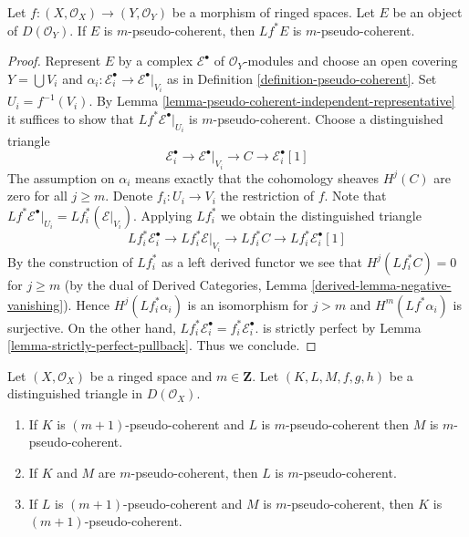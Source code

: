 \begin{lemma}
\label{lemma-pseudo-coherent-pullback}
Let $f : (X, \mathcal{O}_X) \to (Y, \mathcal{O}_Y)$
be a morphism of ringed spaces. Let $E$ be an object of
$D(\mathcal{O}_Y)$. If $E$ is $m$-pseudo-coherent,
then $Lf^*E$ is $m$-pseudo-coherent.
\end{lemma}

\begin{proof}
Represent $E$ by a complex $\mathcal{E}^\bullet$ of $\mathcal{O}_Y$-modules
and choose an open covering $Y = \bigcup V_i$ and
$\alpha_i : \mathcal{E}_i^\bullet \to \mathcal{E}^\bullet|_{V_i}$
as in Definition \ref{definition-pseudo-coherent}.
Set $U_i = f^{-1}(V_i)$.
By Lemma \ref{lemma-pseudo-coherent-independent-representative}
it suffices to show that $Lf^*\mathcal{E}^\bullet|_{U_i}$ is
$m$-pseudo-coherent.
Choose a distinguished triangle
$$
\mathcal{E}_i^\bullet \to
\mathcal{E}^\bullet|_{V_i} \to
C \to
\mathcal{E}_i^\bullet[1]
$$
The assumption on $\alpha_i$ means exactly that the cohomology sheaves
$H^j(C)$ are zero for all $j \geq m$. Denote $f_i : U_i \to V_i$
the restriction of $f$. Note that $Lf^*\mathcal{E}^\bullet|_{U_i} = 
Lf_i^*(\mathcal{E}|_{V_i})$. Applying $Lf_i^*$ we obtain
the distinguished triangle
$$
Lf_i^*\mathcal{E}_i^\bullet \to
Lf_i^*\mathcal{E}|_{V_i} \to
Lf_i^*C \to
Lf_i^*\mathcal{E}_i^\bullet[1]
$$
By the construction of $Lf_i^*$ as a left derived functor we see that
$H^j(Lf_i^*C) = 0$ for $j \geq m$ (by the dual of Derived Categories, Lemma
\ref{derived-lemma-negative-vanishing}). Hence $H^j(Lf_i^*\alpha_i)$ is an
isomorphism for $j > m$ and $H^m(Lf^*\alpha_i)$ is surjective.
On the other hand,
$Lf_i^*\mathcal{E}_i^\bullet = f_i^*\mathcal{E}_i^\bullet$.
is strictly perfect by Lemma \ref{lemma-strictly-perfect-pullback}.
Thus we conclude.
\end{proof}

\begin{lemma}
\label{lemma-cone-pseudo-coherent}
Let $(X, \mathcal{O}_X)$ be a ringed space and $m \in \mathbf{Z}$.
Let $(K, L, M, f, g, h)$ be a distinguished triangle in $D(\mathcal{O}_X)$.
\begin{enumerate}
\item If $K$ is $(m + 1)$-pseudo-coherent and $L$ is $m$-pseudo-coherent
then $M$ is $m$-pseudo-coherent.
\item If $K$ and $M$ are $m$-pseudo-coherent, then $L$ is $m$-pseudo-coherent.
\item If $L$ is $(m + 1)$-pseudo-coherent and $M$
is $m$-pseudo-coherent, then $K$ is $(m + 1)$-pseudo-coherent.
\end{enumerate}
\end{lemma}

